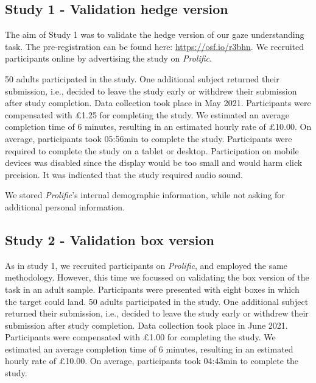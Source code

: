 \documentclass[
  man,floatsintext]{apa6}
\begin{document}
\hypertarget{study-1---validation-hedge-version}{%
\subsection{Study 1 - Validation hedge version}\label{study-1---validation-hedge-version}}

The aim of Study 1 was to validate the hedge version of our gaze understanding task.
The pre-registration can be found here: \url{https://osf.io/r3bhn}.
We recruited participants online by advertising the study on \emph{Prolific}.

50 adults participated in the study.
One additional subject returned their submission, i.e., decided to leave the study early or withdrew their submission after study completion.
Data collection took place in May 2021.
Participants were compensated with £1.25 for completing the study.
We estimated an average completion time of 6 minutes, resulting in an estimated hourly rate of £10.00.
On average, participants took 05:56min to complete the study.
Participants were required to complete the study on a tablet or desktop.
Participation on mobile devices was disabled since the display would be too small and would harm click precision.
It was indicated that the study required audio sound.

We stored \emph{Prolific}'s internal demographic information, while not asking for additional personal information.

\hypertarget{study-2---validation-box-version}{%
\subsection{Study 2 - Validation box version}\label{study-2---validation-box-version}}

As in study 1, we recruited participants on \emph{Prolific}, and employed the same methodology.
However, this time we focussed on validating the box version of the task in an adult sample.
Participants were presented with eight boxes in which the target could land.
50 adults participated in the study.
One additional subject returned their submission, i.e., decided to leave the study early or withdrew their submission after study completion.
Data collection took place in June 2021.
Participants were compensated with £1.00 for completing the study.
We estimated an average completion time of 6 minutes, resulting in an estimated hourly rate of £10.00.
On average, participants took 04:43min to complete the study.
\end{document}
